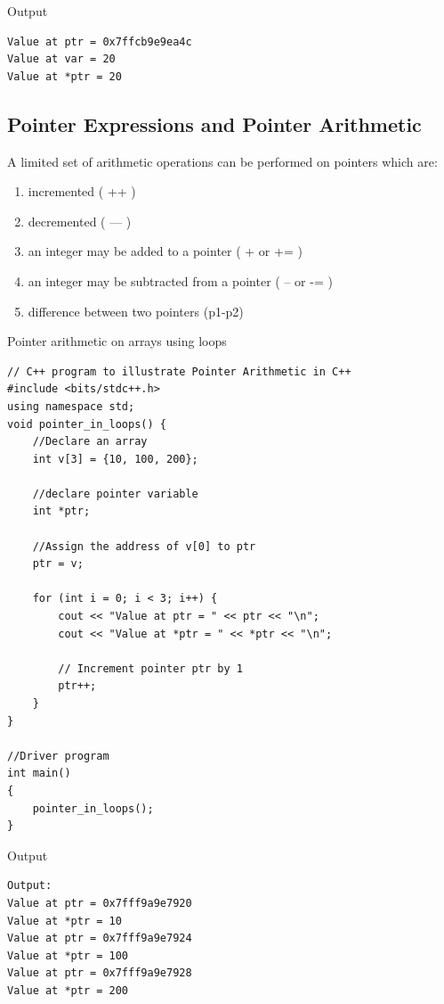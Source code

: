 \documentclass{book}
\begin{document}
Output 

\begin{verbatim}
Value at ptr = 0x7ffcb9e9ea4c
Value at var = 20
Value at *ptr = 20
\end{verbatim}

\subsection{Pointer Expressions and Pointer Arithmetic}

A limited set of arithmetic operations can be performed on pointers which are:

\begin{enumerate}
	\item incremented ( ++ )
\item decremented ( — )
\item an integer may be added to a pointer ( + or += )
\item an integer may be subtracted from a pointer ( – or -= )
\item difference between two pointers (p1-p2)

\end{enumerate}

Pointer arithmetic on arrays using loops

\begin{lstlisting}
// C++ program to illustrate Pointer Arithmetic in C++
#include <bits/stdc++.h>
using namespace std;
void pointer_in_loops() {
	//Declare an array
	int v[3] = {10, 100, 200};
		
	//declare pointer variable 
	int *ptr;
		
	//Assign the address of v[0] to ptr
	ptr = v;
		
	for (int i = 0; i < 3; i++) {
		cout << "Value at ptr = " << ptr << "\n";
		cout << "Value at *ptr = " << *ptr << "\n";
			
		// Increment pointer ptr by 1 
		ptr++;
	}
}
  
//Driver program
int main()
{
	pointer_in_loops();
}
\end{lstlisting}

Output 

\begin{verbatim}
Output:
Value at ptr = 0x7fff9a9e7920
Value at *ptr = 10
Value at ptr = 0x7fff9a9e7924
Value at *ptr = 100
Value at ptr = 0x7fff9a9e7928
Value at *ptr = 200
\end{verbatim}

\end{document}
